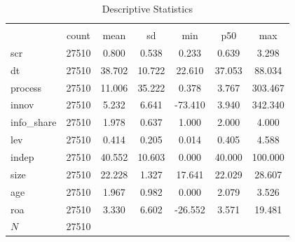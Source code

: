 \begin{table}[htbp]\centering
\def\sym#1{\ifmmode^{#1}\else\(^{#1}\)\fi}
\caption{Descriptive Statistics}
\begin{tabular}{l*{1}{cccccc}}
\hline\hline
            &\multicolumn{6}{c}{}                                                         \\
            &       count&        mean&          sd&         min&         p50&         max\\
\hline
scr         &       27510&       0.800&       0.538&       0.233&       0.639&       3.298\\
dt          &       27510&      38.702&      10.722&      22.610&      37.053&      88.034\\
process     &       27510&      11.006&      35.222&       0.378&       3.767&     303.467\\
innov       &       27510&       5.232&       6.641&     -73.410&       3.940&     342.340\\
info\_share  &       27510&       1.978&       0.637&       1.000&       2.000&       4.000\\
lev         &       27510&       0.414&       0.205&       0.014&       0.405&       4.588\\
indep       &       27510&      40.552&      10.603&       0.000&      40.000&     100.000\\
size        &       27510&      22.228&       1.327&      17.641&      22.029&      28.607\\
age         &       27510&       1.967&       0.982&       0.000&       2.079&       3.526\\
roa         &       27510&       3.330&       6.602&     -26.552&       3.571&      19.481\\
\hline
\(N\)       &       27510&            &            &            &            &            \\
\hline\hline
\end{tabular}
\end{table}
